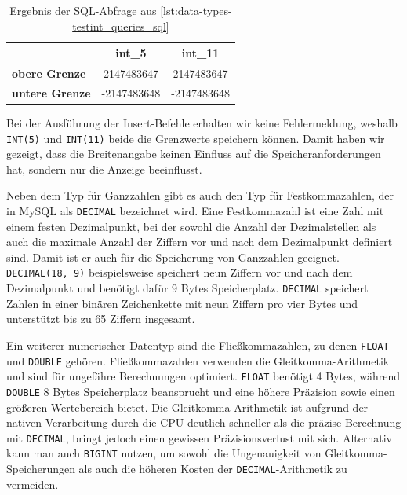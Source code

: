 \vspace{-7pt}

\vspace{-9pt}
\begin{table}[H]
    \centering
    \caption{Ergebnis der SQL-Abfrage aus \ref{lst:data-types-testint_queries_sql}}
    \vspace{-3pt}
    \begin{tabular}{l|c|c}
        & \textbf{int\_5} & \textbf{int\_11} \\ \hline
        \textbf{obere Grenze} & 2147483647 & 2147483647 \\ \hline
        \textbf{untere Grenze} & -2147483648 & -2147483648
    \end{tabular}
    \label{tab:int_values}
\end{table}
\vspace{-9pt}

Bei der Ausführung der Insert-Befehle erhalten wir keine Fehlermeldung, weshalb \texttt{INT(5)} und \texttt{INT(11)} beide die Grenzwerte speichern können.
Damit haben wir gezeigt, dass die Breitenangabe keinen Einfluss auf die Speicheranforderungen hat, sondern nur die Anzeige beeinflusst.

Neben dem Typ für Ganzzahlen gibt es auch den Typ für Festkommazahlen, der in MySQL als \texttt{DECIMAL} bezeichnet wird.
Eine Festkommazahl ist eine Zahl mit einem festen Dezimalpunkt, bei der sowohl die Anzahl der Dezimalstellen als auch die maximale Anzahl der Ziffern vor und nach dem Dezimalpunkt definiert sind.
Damit ist er auch für die Speicherung von Ganzzahlen geeignet.
\texttt{DECIMAL(18, 9)} beispielsweise speichert neun Ziffern vor und nach dem Dezimalpunkt und benötigt dafür 9 Bytes Speicherplatz.
\texttt{DECIMAL} speichert Zahlen in einer binären Zeichenkette mit neun Ziffern pro vier Bytes und unterstützt bis zu 65 Ziffern insgesamt.

Ein weiterer numerischer Datentyp sind die Fließkommazahlen, zu denen \texttt{FLOAT} und \texttt{DOUBLE} gehören.
Fließkommazahlen verwenden die Gleitkomma-Arithmetik und sind für ungefähre Berechnungen optimiert.
\texttt{FLOAT} benötigt 4 Bytes, während \texttt{DOUBLE} 8 Bytes Speicherplatz beansprucht und eine höhere Präzision sowie einen größeren Wertebereich bietet.
Die Gleitkomma-Arithmetik ist aufgrund der nativen Verarbeitung durch die CPU deutlich schneller als die präzise Berechnung mit \texttt{DECIMAL}, bringt jedoch einen gewissen Präzisionsverlust mit sich.
Alternativ kann man auch \texttt{BIGINT} nutzen, um sowohl die Ungenauigkeit von Gleitkomma-Speicherungen als auch die höheren Kosten der \texttt{DECIMAL}-Arithmetik zu vermeiden.

